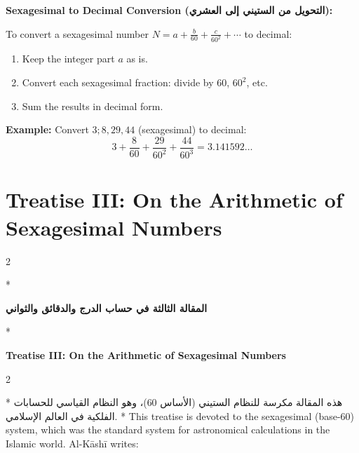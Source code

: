 \documentclass[11pt,a4paper]{article}
\newcommand{\ar}[1]{\arabicfont\beginR #1\endR}
\newenvironment{bilingual}{%
  \vspace{0.3em}%
  \begin{paracol}{2}%
}{%
  \end{paracol}%
  \vspace{0.3em}%
}
\newenvironment{mathalgo}{%
  \par\vspace{0.3cm}
  \begin{framed}
  \setlength{\parindent}{0pt}
}{%
  \end{framed}
  \par\vspace{0.3cm}
}
\begin{document}
\begin{mathalgo}
\textbf{Sexagesimal to Decimal Conversion (\ar{التحويل من الستيني إلى العشري}):}

To convert a sexagesimal number $N = a + \frac{b}{60} +
\frac{c}{60^2} + \cdots$ to decimal:
\begin{enumerate}[nosep]
  \item Keep the integer part $a$ as is.
  \item Convert each sexagesimal fraction: divide by $60$, $60^2$, etc.
  \item Sum the results in decimal form.
\end{enumerate}

\textbf{Example:} Convert $3; 8, 29, 44$ (sexagesimal) to decimal:
\[
3 + \frac{8}{60} + \frac{29}{60^2} + \frac{44}{60^3} = 3.141592\ldots
\]
\end{mathalgo}
\clearpage


\section{Treatise III: On the Arithmetic of Sexagesimal Numbers}
\label{sec:treatise3}

\begin{bilingual}
\switchcolumn[0]*
\begin{center}
\textbf{\Large\color{chapcolor}\ar{المقالة الثالثة في حساب الدرج والدقائق والثواني}}
\end{center}
\switchcolumn[1]*
\begin{center}
\textbf{\Large\color{chapcolor}Treatise III: On the Arithmetic of Sexagesimal Numbers}
\end{center}
\end{bilingual}

\begin{bilingual}
\switchcolumn[0]*
\ar{هذه المقالة مكرسة للنظام الستيني (الأساس 60)، وهو النظام القياسي للحسابات الفلكية في العالم الإسلامي.}
\switchcolumn[1]*
This treatise is devoted to the sexagesimal (base-60) system,
which was the standard system for astronomical calculations in the
Islamic world. Al-K\=ash\=i writes:
\end{bilingual}
\end{document}
